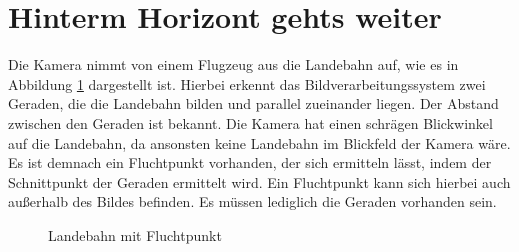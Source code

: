 \documentclass{ezb}
\begin{document}
\section{Hinterm Horizont gehts weiter}
Die Kamera nimmt von einem Flugzeug aus die Landebahn auf, wie es in Abbildung \ref{landebahnAufgBild} dargestellt ist. Hierbei erkennt das Bildverarbeitungssystem zwei Geraden, die die Landebahn bilden und parallel zueinander liegen. Der Abstand zwischen den Geraden ist bekannt. Die Kamera hat einen schrägen Blickwinkel auf die Landebahn, da ansonsten keine Landebahn im Blickfeld der Kamera wäre. Es ist demnach ein Fluchtpunkt vorhanden, der sich ermitteln lässt, indem der Schnittpunkt der Geraden ermittelt wird. Ein Fluchtpunkt kann sich hierbei auch außerhalb des Bildes befinden. Es müssen lediglich die Geraden vorhanden sein.

\begin{figure}[htbp]
	\centering
	\caption{Landebahn mit Fluchtpunkt}
	\label{landebahnAufgBild}
\end{figure}
\end{document}
